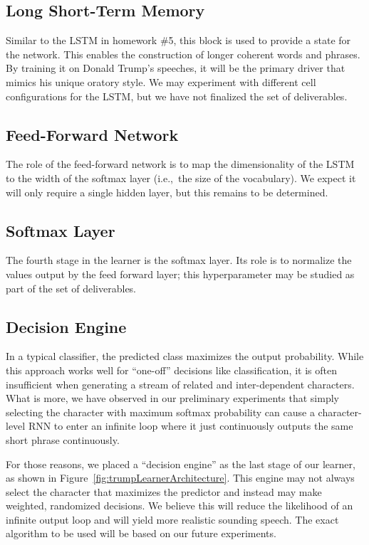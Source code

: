 \documentclass{report}
\begin{document}
  \subsection{Long Short-Term Memory}
  
  Similar to the LSTM in homework \#5, this block is used to provide a state for the network.  This enables the construction of longer coherent words and phrases.  By training it on Donald Trump's speeches, it will be the primary driver that mimics his unique oratory style.  We may experiment with different cell configurations for the LSTM, but we have not finalized the set of deliverables.
    
  \subsection{Feed-Forward Network}
  
  The role of the feed-forward network is to map the dimensionality of the LSTM to the width of the softmax layer (i.e.,~the size of the vocabulary).  We expect it will only require a single hidden layer, but this remains to be determined. 
  
  \subsection{Softmax Layer}
  
  The fourth stage in the learner is the softmax layer. Its role is to normalize the values output by the feed forward layer; this hyperparameter may be studied as part of the set of deliverables.  
  
  \subsection{Decision Engine}
  
  In a typical classifier, the predicted class maximizes the output probability.  While this approach works well for ``one-off'' decisions like classification, it is often insufficient when generating a stream of related and inter-dependent characters.  What is more, we have observed in our preliminary experiments that simply selecting the character with maximum softmax probability can cause a character-level RNN to enter an infinite loop where it just continuously outputs the same short phrase continuously.
  
  For those reasons, we placed a ``decision engine'' as the last stage of our learner, as shown in Figure~\ref{fig:trumpLearnerArchitecture}.  This engine may not always select the character that maximizes the predictor and instead may make weighted, randomized decisions.  We believe this will reduce the likelihood of an infinite output loop and will yield more realistic sounding speech.  The exact algorithm to be used will be based on our future experiments.
  
\end{document}
